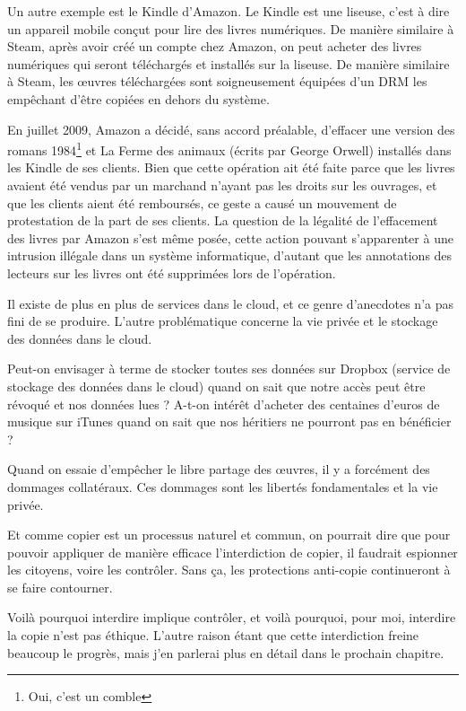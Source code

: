 Un autre exemple est le Kindle d'Amazon.
Le Kindle est une liseuse, c'est à dire un appareil mobile conçut pour lire des livres numériques.
De manière similaire à Steam, après avoir créé un compte chez Amazon, on peut acheter des livres numériques qui seront téléchargés et installés sur la liseuse.
De manière similaire à Steam, les œuvres téléchargées sont soigneusement équipées d'un DRM les empêchant d'être copiées en dehors du système.

En juillet 2009, Amazon a décidé, sans accord préalable, d'effacer une version des romans 1984\footnote{Oui, c'est un comble} et La Ferme des animaux (écrits par George Orwell) installés dans les Kindle de ses clients.
Bien que cette opération ait été faite parce que les livres avaient été vendus par un marchand n'ayant pas les droits sur les ouvrages, et que les clients aient été remboursés, ce geste a causé un mouvement de protestation de la part de ses clients.
La question de la légalité de l'effacement des livres par Amazon s'est même posée, cette action pouvant s'apparenter à une intrusion illégale dans un système informatique, d'autant que les annotations des lecteurs sur les livres ont été supprimées lors de l'opération.

Il existe de plus en plus de services dans le cloud, et ce genre d'anecdotes n'a pas fini de se produire.
L'autre problématique concerne la vie privée et le stockage des données dans le cloud.

Peut-on envisager à terme de stocker toutes ses données sur Dropbox (service de stockage des données dans le cloud) quand on sait que notre accès peut être révoqué et nos données lues ?
A-t-on intérêt d'acheter des centaines d'euros de musique sur iTunes quand on sait que nos héritiers ne pourront pas en bénéficier ?

Quand on essaie d'empêcher le libre partage des œuvres, il y a forcément des dommages collatéraux.
Ces dommages sont les libertés fondamentales et la vie privée.

Et comme copier est un processus naturel et commun, on pourrait dire que pour pouvoir appliquer de manière efficace l'interdiction de copier, il faudrait espionner les citoyens, voire les contrôler.
Sans ça, les protections anti-copie continueront à se faire contourner.

Voilà pourquoi interdire implique contrôler, et voilà pourquoi, pour moi, interdire la copie n'est pas éthique.
L'autre raison étant que cette interdiction freine beaucoup le progrès, mais j'en parlerai plus en détail dans le prochain chapitre.

